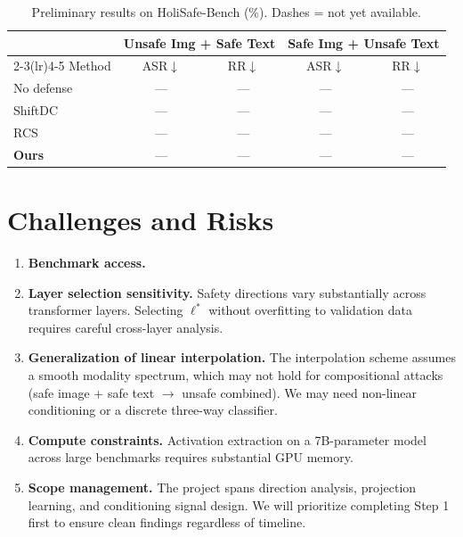 \documentclass{article}
\begin{document}
\begin{table}[h]
\centering
\caption{Preliminary results on HoliSafe-Bench (\%). Dashes = not yet available.}
\label{tab:results}
\begin{tabular}{lcccc}
\toprule
 & \multicolumn{2}{c}{Unsafe Img + Safe Text}
 & \multicolumn{2}{c}{Safe Img + Unsafe Text} \\
\cmidrule(lr){2-3}\cmidrule(lr){4-5}
Method & ASR$\downarrow$ & RR$\downarrow$ & ASR$\downarrow$ & RR$\downarrow$ \\
\midrule
No defense                           & --- & --- & --- & --- \\
ShiftDC~\cite{zou2025shiftdc}        & --- & --- & --- & --- \\
RCS~\cite{liu2025rcs}               & --- & --- & --- & --- \\
\textbf{Ours}                        & --- & --- & --- & --- \\
\bottomrule
\end{tabular}
\end{table}

\section{Challenges and Risks}

\begin{enumerate}[leftmargin=*]
  \item \textbf{Benchmark access.}

  \item \textbf{Layer selection sensitivity.}
        Safety directions vary substantially across transformer layers. Selecting $\ell^*$ without
        overfitting to validation data requires careful cross-layer analysis.

  \item \textbf{Generalization of linear interpolation.}
        The interpolation scheme assumes a smooth modality spectrum, which may not hold for
        compositional attacks (safe image + safe text $\to$ unsafe combined). We may need
        non-linear conditioning or a discrete three-way classifier.

  \item \textbf{Compute constraints.}
        Activation extraction on a 7B-parameter model across large benchmarks requires substantial
        GPU memory.

  \item \textbf{Scope management.}
        The project spans direction analysis, projection learning, and conditioning signal design.
        We will prioritize completing Step 1 first to ensure clean findings regardless of timeline.
\end{enumerate}
\end{document}

